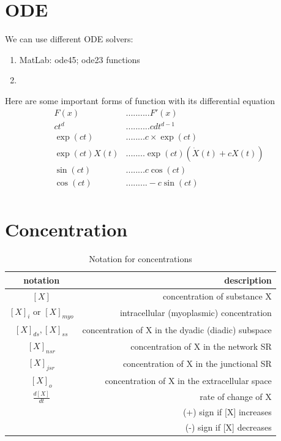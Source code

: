 \section{ODE}
\label{sec:ode}

We can use different ODE solvers:
\begin{enumerate}
  \item MatLab: ode45; ode23 functions
  
  \item 
\end{enumerate}

Here are some important forms of function with its differential equation
\begin{equation}
  \label{eq:84}
  \begin{split}
    F(x) &.......... F'(x) \\
    ct^d &.......... cdt^{d-1} \\
    \exp(ct) &........ c\times\exp(ct) \\
    \exp(ct)X(t)&........ \exp(ct) (\dot{X}(t) + cX(t))\\
    \sin(ct)&........ c\cos(ct)\\
    \cos(ct)&......... -c\sin(ct) \\    
  \end{split}
\end{equation}

\section{Concentration}
\label{sec:concentration}

\begin{table}[hbt]
\begin{center}
\caption{Notation for concentrations}
\begin{tabular}{cr} 
\hline
notation & description \\ 
\hline\hline
$[X]$ & concentration of substance X \\
$[X]_i$ or $[X]_{myo}$ & intracellular (myoplasmic) concentration \\
$[X]_{ds},[X]_{ss}$ & concentration of X in the dyadic (diadic) subspace \\
$[X]_{nsr}$ & concentration of X in the network SR \\
$[X]_{jsr}$ & concentration of X in the junctional SR \\
$[X]_{o}$ &  concentration of X in the extracellular space \\
$\frac{d[X]}{dt}$ & rate of change of X \\
& (+) sign if [X] increases \\
& (-) sign if [X] decreases \\
\end{tabular}
\end{center}
\label{tab:Concentration}
\end{table}

